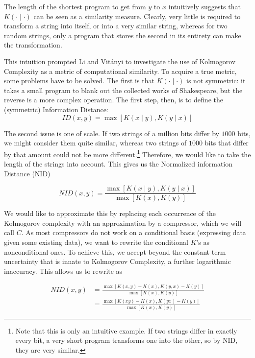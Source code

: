 \documentclass{article}
\begin{document}
The length of the shortest program to get from $y$ to $x$ intuitively suggests that $K(\cdot\mid \cdot)$ can be seen as a similarity measure. Clearly, very little is required to transform a string into itself, or into a very similar string, whereas for two random strings, only a program that stores the second in its entirety can make the transformation.

This intuition prompted Li and Vit{\'a}nyi \cite{li2004similarity} to investigate the use of Kolmogorov Complexity as a metric of computational similarity. To acquire a true metric, some problems have to be solved. The first is that $K(\cdot\mid \cdot)$ is not symmetric: it takes a small program to blank out the collected works of Shakespeare, but the reverse is a more complex operation. The first step, then, is to define the (symmetric) Information Distance:
\[
ID(x, y) = \max \left [K(x\mid y),K(y\mid x) \right ] 
\]  

The second issue is one of scale. If two strings of a million bits differ by $1000$ bits, we might consider them quite similar, whereas two strings of $1000$ bits that differ by that amount could not be more different.\footnote{Note that this is only an intuitive example. If two strings differ in exactly every bit, a very short program transforms one into the other, so by NID, they are very similar.} Therefore, we would like to take the length of the strings into account. This gives us the Normalized information Distance (NID)

\[
NID(x, y) = \frac{\max \left [K(x \mid y),K(y \mid x) \right ] }{\max \left [K(x), K(y) \right ]}
\] 

We would like to approximate this by replacing each occurrence of the Kolmogorov complexity with an approximation by a compressor, which we will call $C$. As most compressors do not work on a conditional basis (expressing data given some existing data), we want to rewrite the conditional $K$'s as nonconditional ones. To achieve this, we accept beyond the constant term uncertainty that is innate to Kolmogorov Complexity, a further logarithmic inaccuracy. This allows us to rewrite as

\begin{align*}
NID(x, y)	 &= \frac{\max \left [K(x, y) - K(x),K(y, x) - K(y)\right ] }{\max \left [K(x), K(y) \right ]} \\ 
	&= \frac{\max \left [K(xy) - K(x),K(yx) - K(y)\right ] } {\max \left [K(x), K(y) \right ]}
\end{align*}
\end{document}

